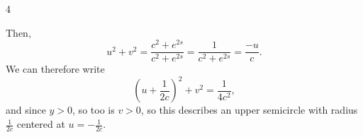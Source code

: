 \documentclass[11pt]{article}
\begin{document}
\begin{problem}{4}
\begin{enumerate}[label=(\alph*)]
\begin{answer}
\begin{itemize}
                    Then,
              \begin{equation}
              \label{eq:5}
              u^2 + v^2 = \frac{c^2 + e^{2s}}{c^2 + e^{2s}} = \frac{1}{c^2 + e^{2s}} = \frac{-u}{c}.
            \end{equation}
                    We can therefore write
                    \begin{equation}
                    \label{eq:6}
                    (u + \frac{1}{2c})^2 + v^2 = \frac{1}{4c^2},
                  \end{equation}
                    and since \( y > 0 \), so too is \( v > 0 \), so this describes an upper semicircle with radius \( \frac{1}{2c} \) centered at \( u = - \frac{1}{2c} \).
            \end{itemize}
          \end{answer}
  \end{enumerate}
\end{problem}
\end{document}
